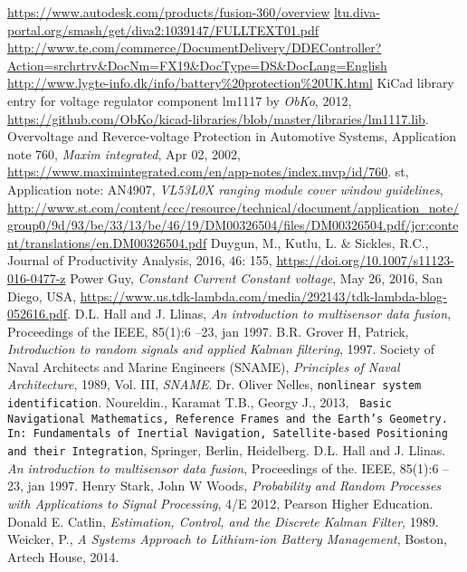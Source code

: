 \begin{thebibliography}{99}
\label{sec:ref}

	\url{https://www.autodesk.com/products/fusion-360/overview}
	\url{ltu.diva-portal.org/smash/get/diva2:1039147/FULLTEXT01.pdf}
	\url{http://www.te.com/commerce/DocumentDelivery/DDEController?Action=srchrtrv&DocNm=FX19&DocType=DS&DocLang=English}
	\url{http://www.lygte-info.dk/info/battery\%20protection\%20UK.html}
	KiCad library entry for voltage regulator component lm1117 by \emph{ObKo}, 2012,
	\url{https://github.com/ObKo/kicad-libraries/blob/master/libraries/lm1117.lib}.
	Overvoltage and Reverce-voltage Protection in Automotive Systems,
	Application note 760, \emph{Maxim integrated}, Apr 02, 2002, 
	\url{https://www.maximintegrated.com/en/app-notes/index.mvp/id/760}.
	\gls{st}, Application note: AN4907, \emph{VL53L0X ranging module cover window guidelines},
	\url{http://www.st.com/content/ccc/resource/technical/document/application_note/group0/9d/93/be/33/13/be/46/19/DM00326504/files/DM00326504.pdf/jcr:content/translations/en.DM00326504.pdf}
	Duygun, M., Kutlu, L. \& Sickles, R.C., Journal of Productivity Analysis, 2016, 46: 155, \url{https://doi.org/10.1007/s11123-016-0477-z}
	Power Guy, \emph{Constant Current Constant voltage}, May 26, 2016, San Diego, USA,
	\url{https://www.us.tdk-lambda.com/media/292143/tdk-lambda-blog-052616.pdf}.
	D.L. Hall and J. Llinas, \emph{An introduction to multisensor data fusion}, 
	Proceedings of the IEEE, 85(1):6 –23, jan 1997.
	B.R. Grover H, Patrick, \emph{Introduction to random signals and applied Kalman filtering}, 1997. 
	Society of Naval Architects and Marine Engineers (SNAME), \emph{Principles of Naval Architecture}, 1989, Vol. III, \emph{SNAME}. 
	Dr. Oliver Nelles, \texttt{nonlinear system identification}.
	Noureldin., Karamat T.B., Georgy J., 2013, \texttt{ Basic Navigational Mathematics, Reference Frames and the Earth’s Geometry. In: Fundamentals of Inertial Navigation, Satellite-based 	Positioning and their Integration}, Springer, Berlin, Heidelberg.
	D.L. Hall and J. Llinas. \emph{An introduction to multisensor data fusion}, Proceedings of the. IEEE, 85(1):6 –23, jan 1997.
	Henry Stark, John W Woods, \emph{Probability and Random Processes with Applications to Signal Processing}, 4/E 2012,
	 Pearson Higher Education.
	Donald E. Catlin, \emph{Estimation, Control, and the Discrete Kalman Filter}, 1989.
	Weicker, P., \emph{A Systems Approach to Lithium-ion Battery Management}, Boston, Artech House, 2014.
\end{thebibliography}
